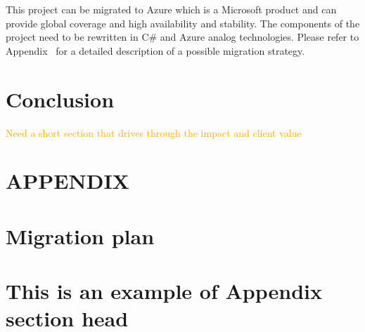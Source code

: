 \documentclass[prodmode,acmtosem]{acmsmall} %
\begin{document}
This project can be migrated to Azure which is a Microsoft product and can provide global coverage and high availability and stability. The components of the project need to be rewritten in C\# and Azure analog technologies. Please refer to Appendix~\cite{app:MigrationPlan} for a detailed description of a possible migration strategy.


\section{Conclusion}
\textcolor{orange}{Need a short section that drives through the impact and client value}


\appendix
\section*{APPENDIX} \label{Appendix}
\setcounter{section}{1}


\begin{acks}
\end{acks}  





\elecappendix

\medskip

\section{Migration plan}
\label{app:MigrationPlan}
\section{This is an example of Appendix section head}

\pagebreak
\end{document}
